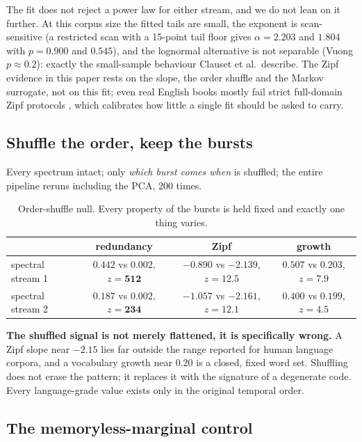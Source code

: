 \documentclass[11pt,a4paper]{article}
\begin{document}
The fit does not reject a power law for either stream, and we do not lean on it
further. At this corpus size the fitted tails are small, the exponent is
scan-sensitive (a restricted scan with a 15-point tail floor gives $\alpha = 2.203$
and $1.804$ with $p = 0.900$ and $0.545$), and the lognormal alternative is not
separable (Vuong $p \approx 0.2$): exactly the small-sample behaviour Clauset et al.\
describe. The Zipf evidence in this paper rests on the slope, the order shuffle and
the Markov surrogate, not on this fit; even real English books mostly fail strict
full-domain Zipf protocols \cite{moreno2016}, which calibrates how little a single
fit should be asked to carry.

\subsection{Shuffle the order, keep the bursts}

Every spectrum intact; only \emph{which burst comes when} is shuffled; the entire
pipeline reruns including the PCA, 200 times.

\begin{table}[htbp]
\centering
\caption{Order-shuffle null. Every property of the bursts is held fixed and exactly one
thing varies.}
\label{tab:shuffle}
\small
\begin{tabular}{lccc}
\toprule
 & redundancy & Zipf & growth \\
\midrule
spectral stream 1 & $0.442$ vs $0.002$, $z = \mathbf{512}$
                 & $-0.890$ vs $-2.139$, $z = \mathbf{12.5}$
                 & $0.507$ vs $0.203$, $z = \mathbf{7.9}$ \\
spectral stream 2 & $0.187$ vs $0.002$, $z = \mathbf{234}$
                 & $-1.057$ vs $-2.161$, $z = \mathbf{12.1}$
                 & $0.400$ vs $0.199$, $z = \mathbf{4.5}$ \\
\bottomrule
\end{tabular}
\end{table}

\textbf{The shuffled signal is not merely flattened, it is specifically wrong.} A Zipf
slope near $-2.15$ lies far outside the range reported for human language corpora, and a
vocabulary growth near $0.20$ is a closed, fixed word set. Shuffling does not erase the
pattern; it replaces it with the signature of a degenerate code. Every language-grade
value exists only in the original temporal order.

\subsection{The memoryless-marginal control}
\label{sec:memoryless}
\end{document}
